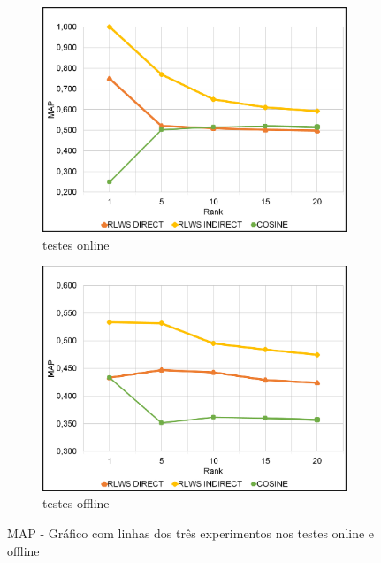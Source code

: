 \begin{figure}
    \begin{subfigure}{.5\textwidth}
        \centering
        \includegraphics[width=.8\linewidth]{imagens/map_results_online.jpg}
        \caption{testes online}
        \label{fig:map_line_a}
    \end{subfigure}%
    \begin{subfigure}{.5\textwidth}
        \centering
        \includegraphics[width=.8\linewidth]{imagens/map_results_offline.jpg}
        \caption{testes offline}
        \label{fig:map_line_b}
    \end{subfigure}
    \caption{MAP - Gráfico com linhas dos três experimentos nos testes online e offline}
    \label{fig:map_line}
\end{figure}

